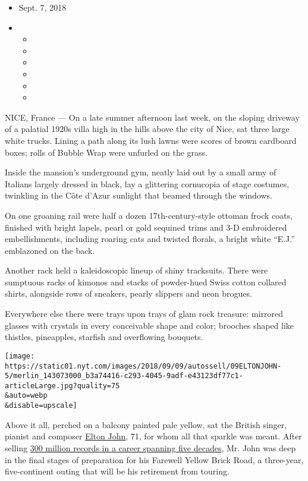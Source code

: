 \begin{itemize}
\item
  Sept. 7, 2018
\item
  \begin{itemize}
  \item
  \item
  \item
  \item
  \item
  \item
  \end{itemize}
\end{itemize}

NICE, France --- On a late summer afternoon last week, on the sloping
driveway of a palatial 1920s villa high in the hills above the city of
Nice, sat three large white trucks. Lining a path along its lush lawns
were scores of brown cardboard boxes; rolls of Bubble Wrap were unfurled
on the grass.

Inside the mansion's underground gym, neatly laid out by a small army of
Italians largely dressed in black, lay a glittering cornucopia of stage
costumes, twinkling in the Côte d'Azur sunlight that beamed through the
windows.

On one groaning rail were half a dozen 17th-century-style ottoman frock
coats, finished with bright lapels, pearl or gold sequined trims and 3-D
embroidered embellishments, including roaring cats and twisted florals,
a bright white ``E.J.'' emblazoned on the back.

Another rack held a kaleidoscopic lineup of shiny tracksuits. There were
sumptuous racks of kimonos and stacks of powder-hued Swiss cotton
collared shirts, alongside rows of sneakers, pearly slippers and neon
brogues.

Everywhere else there were trays upon trays of glam rock treasure:
mirrored glasses with crystals in every conceivable shape and color;
brooches shaped like thistles, pineapples, starfish and overflowing
bouquets.

\texttt{[image: https://static01.nyt.com/images/2018/09/09/autossell/09ELTONJOHN-5/merlin\_143073000\_b3a74416-c293-4045-9adf-e43123df77c1-articleLarge.jpg?quality=75\\\&auto=webp\\\&disable=upscale]}

Above it all, perched on a balcony painted pale yellow, sat the British
singer, pianist and composer
\href{https://www.nytimes.com/topic/person/elton-john}{Elton John}, 71,
for whom all that sparkle was meant. After selling
\href{https://www.nytimes.com/2016/01/31/arts/music/elton-john-still-living-in-the-flourish.html?module=Uisil}{300
million records in a career spanning five decades}, Mr. John was deep in
the final stages of preparation for his Farewell Yellow Brick Road, a
three-year, five-continent outing that will be his retirement from
touring.

